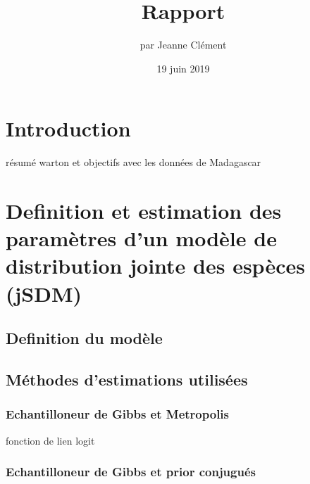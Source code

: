 \documentclass[10pt,]{article}
\title{Rapport}
\author{par Jeanne Clément}
\date{19 juin 2019}
\begin{document}
\maketitle

{
\hypersetup{linkcolor=black}
\setcounter{tocdepth}{3}
\tableofcontents
}
\listoffigures
\hypertarget{introduction}{%
\section{Introduction}\label{introduction}}

résumé warton et objectifs avec les données de Madagascar

\hypertarget{definition-et-estimation-des-parametres-dun-modele-de-distribution-jointe-des-especes-jsdm}{%
\section{Definition et estimation des paramètres d'un modèle de
distribution jointe des espèces
(jSDM)}\label{definition-et-estimation-des-parametres-dun-modele-de-distribution-jointe-des-especes-jsdm}}

\hypertarget{definition-du-modele}{%
\subsection{Definition du modèle}\label{definition-du-modele}}

\hypertarget{methodes-destimations-utilisees}{%
\subsection{Méthodes d'estimations
utilisées}\label{methodes-destimations-utilisees}}

\hypertarget{echantilloneur-de-gibbs-et-metropolis}{%
\subsubsection{Echantilloneur de Gibbs et
Metropolis}\label{echantilloneur-de-gibbs-et-metropolis}}

fonction de lien logit

\hypertarget{echantilloneur-de-gibbs-et-prior-conjugues}{%
\subsubsection{Echantilloneur de Gibbs et prior
conjugués}\label{echantilloneur-de-gibbs-et-prior-conjugues}}
\end{document}
